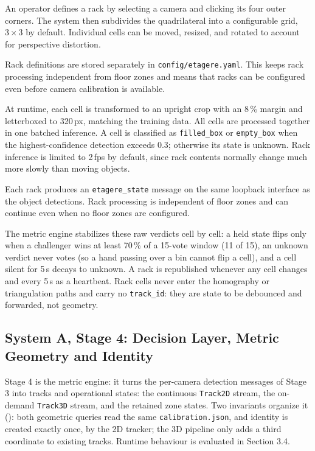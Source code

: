\documentclass[9pt,a4paper,twocolumn]{rho-class/rho}
\begin{document}
An operator defines a rack by selecting a camera and clicking its four outer corners. The system then subdivides the quadrilateral into a configurable grid, $3 \times 3$ by default. Individual cells can be moved, resized, and rotated to account for perspective distortion.

Rack definitions are stored separately in \texttt{config/etagere.yaml}. This keeps rack processing independent from floor zones and means that racks can be configured even before camera calibration is available.

At runtime, each cell is transformed to an upright crop with an 8\,\% margin and letterboxed to 320\,px, matching the training data. All cells are processed together in one batched inference. A cell is classified as \texttt{filled\_box} or \texttt{empty\_box} when the highest-confidence detection exceeds 0.3; otherwise its state is unknown. Rack inference is limited to 2\,fps by default, since rack contents normally change much more slowly than moving objects.

Each rack produces an \texttt{etagere\_state} message on the same loopback interface as the object detections. Rack processing is independent of floor zones and can continue even when no floor zones are configured.

The metric engine stabilizes these raw verdicts cell by cell: a held state flips only when a challenger wins at least 70\,\% of a 15-vote window (11 of 15), an unknown verdict never votes (so a hand passing over a bin cannot flip a cell), and a cell silent for 5\,s decays to unknown. A rack is republished whenever any cell changes and every 5\,s as a heartbeat. Rack cells never enter the homography or triangulation paths and carry no \texttt{track\_id}: they are state to be debounced and forwarded, not geometry.



\subsection{System A, Stage 4: Decision Layer, Metric Geometry and Identity}

Stage 4 is the metric engine: it turns the per-camera detection messages of Stage 3 into tracks and operational states: the continuous \texttt{Track2D} stream, the on-demand \texttt{Track3D} stream, and the retained zone states. Two invariants organize it (): both geometric queries read the same \texttt{calibration.json}, and identity is created exactly once, by the 2D tracker; the 3D pipeline only adds a third coordinate to existing tracks. Runtime behaviour is evaluated in Section 3.4.
\end{document}
